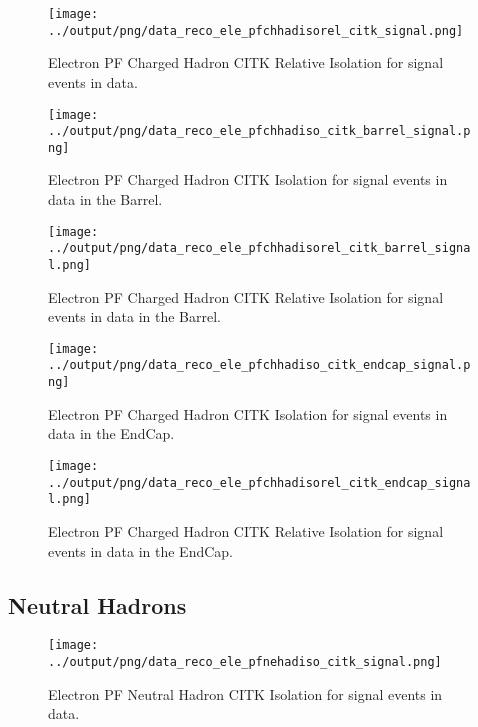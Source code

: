 \documentclass[11pt]{book}
\begin{document}
\begin{figure}[htb]
\centering
\texttt{[image: ../output/png/data\_reco\_ele\_pfchhadisorel\_citk\_signal.png]}
\caption{Electron PF Charged Hadron CITK Relative Isolation for signal events in data.}
\label{fig:data_ele_pfchhadisorel_citk_signal}
\end{figure}

\begin{figure}[htb]
\centering
\texttt{[image: ../output/png/data\_reco\_ele\_pfchhadiso\_citk\_barrel\_signal.png]}
\caption{Electron PF Charged Hadron CITK Isolation for signal events in data in the Barrel.}
\label{fig:data_ele_pfchhadiso_citk_barrel_signal}
\end{figure}

\begin{figure}[htb]
\centering
\texttt{[image: ../output/png/data\_reco\_ele\_pfchhadisorel\_citk\_barrel\_signal.png]}
\caption{Electron PF Charged Hadron CITK Relative Isolation for signal events in data in the Barrel.}
\label{fig:data_ele_pfchhadisorel_citk_barrel_signal}
\end{figure}

\begin{figure}[htb]
\centering
\texttt{[image: ../output/png/data\_reco\_ele\_pfchhadiso\_citk\_endcap\_signal.png]}
\caption{Electron PF Charged Hadron CITK Isolation for signal events in data in the EndCap.}
\label{fig:data_ele_pfchhadiso_citk_endcap_signal}
\end{figure}

\begin{figure}[htb]
\centering
\texttt{[image: ../output/png/data\_reco\_ele\_pfchhadisorel\_citk\_endcap\_signal.png]}
\caption{Electron PF Charged Hadron CITK Relative Isolation for signal events in data in the EndCap.}
\label{fig:data_ele_pfchhadisorel_citk_endcap_signal}
\end{figure}
\clearpage

\subsection{Neutral Hadrons}
\begin{figure}[htb]
\centering
\texttt{[image: ../output/png/data\_reco\_ele\_pfnehadiso\_citk\_signal.png]}
\caption{Electron PF Neutral Hadron CITK Isolation for signal events in data.}
\label{fig:data_ele_pfnehadiso_citk_signal}
\end{figure}
\end{document}
